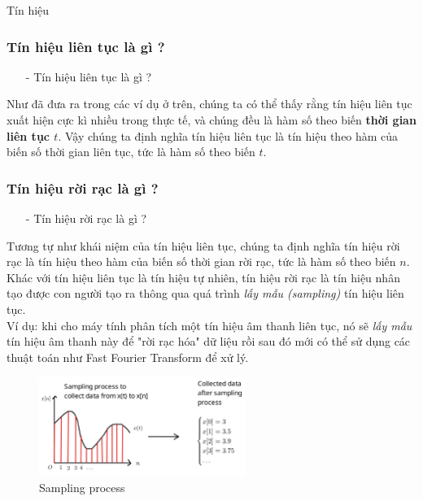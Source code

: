 \documentclass[8pt]{beamer}
\begin{document}
\begin{frame}{Tín hiệu}
\subsubsection{Tín hiệu liên tục là gì ?}
\begin{itemize}
	\item[-] Tín hiệu liên tục là gì ?
\end{itemize}
Như đã đưa ra trong các ví dụ ở trên, chúng ta có thể thấy rằng tín hiệu liên tục xuất hiện cực kì nhiều trong thực tế, và chúng đều là hàm số theo biến \textbf{thời gian liên tục $t$}. Vậy chúng ta định nghĩa \alert{tín hiệu liên tục là tín hiệu theo hàm của biến số thời gian liên tục, tức là hàm số theo biến $t$}. 
\subsubsection{Tín hiệu rời rạc là gì ?}
\begin{itemize}
	\item[-] Tín hiệu rời rạc là gì ?
\end{itemize}
Tương tự như khái niệm của tín hiệu liên tục, chúng ta định nghĩa \alert{tín hiệu rời rạc là tín hiệu theo hàm của biến số thời gian rời rạc, tức là hàm số theo biến $n$}. Khác với tín hiệu liên tục là tín hiệu tự nhiên, tín hiệu rời rạc là tín hiệu nhân tạo được con người tạo ra thông qua quá trình \textit{lấy mẫu (sampling)} tín hiệu liên tục. 
\\ Ví dụ: khi cho máy tính phân tích một tín hiệu âm thanh liên tục, nó sẽ \textit{lấy mẫu} tín hiệu âm thanh này để "rời rạc hóa" dữ liệu rồi sau đó mới có thể sử dụng các thuật toán như \alert{Fast Fourier Transform} để xử lý. 
  \begin{figure}[h]
			\includegraphics[width=0.6\textwidth]{sample.jpg}
			\caption{Sampling process}			\label{fig:re2}
		\end{figure}
\end{frame}
\end{document}
